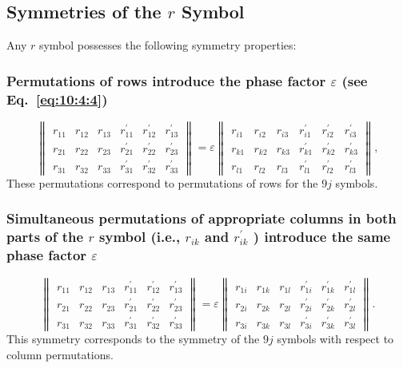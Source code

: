 \subsection{Symmetries of the $r$ Symbol}\label{sec:10.4.2}
Any $r$ symbol possesses the following symmetry properties:\\
\subsubsection{Permutations of rows introduce the phase factor $\varepsilon$ (see Eq.~\protect\eqref{eq:10:4:4})}
\begin{equation}
\left\|\begin{array}{llllll}
r_{11} & r_{12} & r_{13} & r_{11}^{\prime} & r_{12}^{\prime} & r_{13}^{\prime}  \label{eq:10:4:7}\\
r_{21} & r_{22} & r_{23} & r_{21}^{\prime} & r_{22}^{\prime} & r_{23}^{\prime} \\
r_{31} & r_{32} & r_{33} & r_{31}^{\prime} & r_{32}^{\prime} & r_{33}^{\prime}
\end{array}\right\|=\varepsilon\left\|\begin{array}{llllll}
r_{i 1} & r_{i 2} & r_{i 3} & r_{i 1}^{\prime} & r_{i 2}^{\prime} & r_{i 3}^{\prime} \\
r_{k 1} & r_{k 2} & r_{k 3} & r_{k 1}^{\prime} & r_{k 2}^{\prime} & r_{k 3}^{\prime} \\
r_{l 1} & r_{l 2} & r_{l 3} & r_{l 1}^{\prime} & r_{l 2}^{\prime} & r_{l 3}^{\prime}
\end{array}\right\|,
\end{equation}
These permutations correspond to permutations of rows for the $9 j$ symbols.\\
\subsubsection{Simultaneous permutations of appropriate columns in both parts of the $r$ symbol (i.e., $r_{i k}$ and $r_{i k}^{\prime}$ ) introduce the same phase factor $\varepsilon$}
\begin{equation}
\left\|\begin{array}{llllll}
r_{11} & r_{12} & r_{13} & r_{11}^{\prime} & r_{12}^{\prime} & r_{13}^{\prime}  \label{eq:10:4:8}\\
r_{21} & r_{22} & r_{23} & r_{21}^{\prime} & r_{22}^{\prime} & r_{23}^{\prime} \\
r_{31} & r_{32} & r_{33} & r_{31}^{\prime} & r_{32}^{\prime} & r_{33}^{\prime}
\end{array}\right\|=\varepsilon\left\|\begin{array}{llllll}
r_{1 i} & r_{1 k} & r_{1 l} & r_{1 i}^{\prime} & r_{1 k}^{\prime} & r_{1 l}^{\prime} \\
r_{2 i} & r_{2 k} & r_{2 l} & r_{2 i}^{\prime} & r_{2 k}^{\prime} & r_{2 l}^{\prime} \\
r_{3 i} & r_{3 k} & r_{3 l} & r_{3 i}^{\prime} & r_{3 k}^{\prime} & r_{3 l}^{\prime}
\end{array}\right\| .
\end{equation}
This symmetry corresponds to the symmetry of the $9 j$ symbols with respect to column permutations.\\
